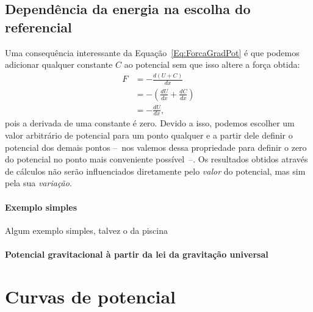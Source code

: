 \subsection{Dependência da energia na escolha do referencial}

Uma consequência interessante da Equação~\eqref{Eq:ForcaGradPot} é que podemos adicionar qualquer constante $C$ ao potencial sem que isso altere a força obtida:
\begin{align}
  F &= - \frac{d(U+C)}{dx} \\
  &= -\left(\frac{dU}{dx} + \frac{dC}{dx}\right) \\
  &= -\frac{dU}{dx},
\end{align}
%
pois a derivada de uma constante é zero. Devido a isso, podemos escolher um valor arbitrário de potencial para um ponto qualquer e a partir dele definir o potencial dos demais pontos --~nos valemos dessa propriedade para definir o zero do potencial no ponto mais conveniente possível~--. Os resultados obtidos através de cálculos não serão influenciados diretamente pelo \emph{valor} do potencial, mas sim pela sua \emph{variação}. 


\paragraph{Exemplo simples}
Algum exemplo simples, talvez o da piscina

\paragraph{Potencial gravitacional à partir da lei da gravitação universal}

\section{Curvas de potencial}

